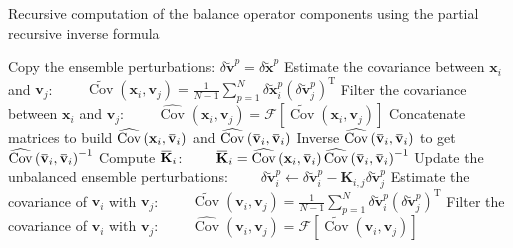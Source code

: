 \documentclass[12pt]{scrartcl}
\newcommand{\overbar}[1]{\mkern 1.5mu\overline{\mkern-1.5mu#1\mkern-1.5mu}\mkern 1.5mu}
\DeclareMathOperator{\Cov}{Cov}
\begin{document}
\clearpage

\begin{algorithm}[!ht]
\caption{Recursive computation of the balance operator components using the partial recursive inverse formula \label{algo:partial}}
\begin{algorithmic}
\STATE Copy the ensemble perturbations:
\STATE $\delta \widetilde{\mathbf{v}}^p = \delta \widetilde{\mathbf{x}}^p$
\ENDFOR
{}
\STATE Estimate the covariance between $\mathbf{x}_i$ and $\mathbf{v}_j$:
\STATE $\displaystyle \qquad \widetilde{\Cov}\left(\mathbf{x}_i, \mathbf{v}_j\right) = \frac{1}{N-1} \sum_{p=1}^N \delta \widetilde{\mathbf{x}}^p_i \left(\delta \widetilde{\mathbf{v}}^p_j\right)^\mathrm{T}$
\STATE Filter the covariance between $\mathbf{x}_i$ and $\mathbf{v}_j$:
\STATE $\displaystyle \qquad \widehat{\Cov}\left(\mathbf{x}_i, \mathbf{v}_j\right) = \mathcal{F} \left[\widetilde{\Cov}\left(\mathbf{x}_i, \mathbf{v}_j\right)\right]$
\ENDFOR
\STATE Concatenate matrices to build $\widehat{\Cov}\left(\mathbf{x}_i, \overbar{\mathbf{v}}_i\right)$ and $\widehat{\Cov}\left(\overbar{\mathbf{v}}_i, \overbar{\mathbf{v}}_i\right)$
\STATE Inverse $\widehat{\Cov}\left(\overbar{\mathbf{v}}_i, \overbar{\mathbf{v}}_i\right)$ to get $\widehat{\Cov}\left(\overbar{\mathbf{v}}_i, \overbar{\mathbf{v}}_i\right)^{-1}$
\STATE Compute $\overbar{\mathbf{K}}_i$:
\STATE $\displaystyle \qquad \overbar{\mathbf{K}}_i = \widehat{\Cov}\left(\mathbf{x}_i, \overbar{\mathbf{v}}_i\right) \widehat{\Cov}\left(\overbar{\mathbf{v}}_i, \overbar{\mathbf{v}}_i\right)^{-1}$
\STATE Update the unbalanced ensemble perturbations:
\STATE $\displaystyle \qquad \delta \widetilde{\mathbf{v}}^p_i \leftarrow \delta \widetilde{\mathbf{v}}^p_i - \mathbf{K}_{i,j} \delta \widetilde{\mathbf{v}}^p_j$
\ENDFOR
\ENDFOR
{}
\STATE Estimate the covariance of $\mathbf{v}_i$ with $\mathbf{v}_j$:
\STATE $\displaystyle \qquad \widetilde{\Cov}\left(\mathbf{v}_i, \mathbf{v}_j\right) = \frac{1}{N-1} \sum_{p=1}^N \delta \widetilde{\mathbf{v}}^p_i \left(\delta \widetilde{\mathbf{v}}^p_j\right)^\mathrm{T}$
\STATE Filter the covariance of $\mathbf{v}_i$ with $\mathbf{v}_j$:
\STATE $\displaystyle \qquad \widehat{\Cov}\left(\mathbf{v}_i, \mathbf{v}_j\right) = \mathcal{F} \left[\widetilde{\Cov}\left(\mathbf{v}_i, \mathbf{v}_j\right)\right]$
\ENDFOR
\ENDIF
\ENDFOR
\end{algorithmic}
\end{algorithm}
\end{document}
